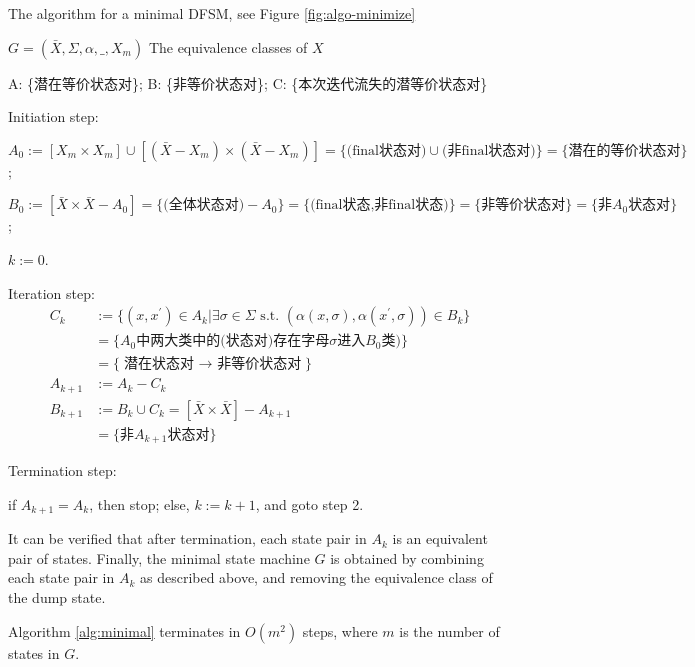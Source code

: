 \begin{algorithm}  
	\caption{The algorithm for a minimal DFSM, see Figure \ref{fig:algo-minimize}}  
	\begin{algorithmic}[1] %
		\Require $G=(\bar{X},\Sigma,\alpha,\_,X_m)$  
		\Ensure The equivalence classes of $X$ 
		
		A: \{潜在等价状态对\}; B: \{非等价状态对\}; C: \{本次迭代流失的潜等价状态对\}
		
		\State Initiation step:
		
		$A_0 := [X_m\times X_m]\cup [(\bar{X}-X_m)\times(\bar{X}-X_m)]=\{\text{(final状态对)}\cup \text{(非final状态对)} \} = \{\text{潜在的等价状态对}\}$; 
		
		$B_0 := [\bar{X}\times\bar{X}-A_0] = \{\text{(全体状态对)}-A_0 \} = \{\text{(final状态,非final状态)} \} = \{\text{非等价状态对}\} = \{\text{非$A_0$状态对}\}$; 
		
		$k:=0$.
		
		\State Iteration step:
		\begin{align*}
			C_k &:= \{(x,x^\prime)\in A_k | \exists\sigma\in\Sigma \text{ s.t. } (\alpha(x,\sigma),\alpha(x^\prime,\sigma))\in B_k \} \\
			&=\{\text{$A_0$中两大类中的(状态对)存在字母$\sigma$进入$B_0$类)} \} \\
			&= \{ \text{潜在状态对 $\to$ 非等价状态对} \}\\
			A_{k+1} &:= A_k - C_k \\
			B_{k+1} &:= B_k\cup C_k =[\bar{X}\times \bar{X}] - A_{k+1}\\
			&=\{\text{非$A_{k+1}$状态对}\}
		\end{align*}
		
		\State Termination step:
		
		if $A_{k+1}=A_k$, then stop; else, $k := k+1$, and goto step 2.
	\end{algorithmic}
    \label{alg:minimal}   
\end{algorithm}

It can be verified that after termination, each state pair in $A_k$ is an equivalent pair of states. Finally, the minimal state machine $G$ is obtained by combining each state pair in $A_k$ as described above, and removing the equivalence class of the dump state.

Algorithm \ref{alg:minimal} terminates in $O(m^2)$ steps, where $m$ is the number of states in $G$.

